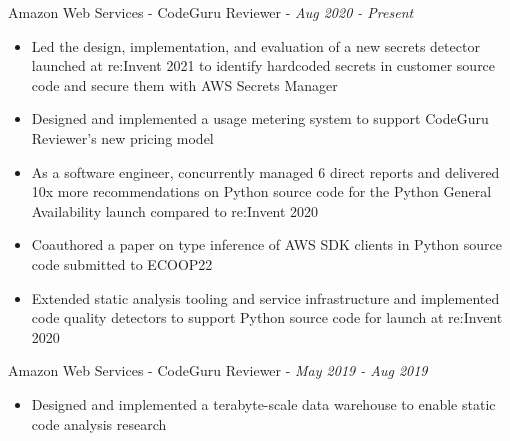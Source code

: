 \documentclass[]{template}
\begin{document}
\begin{entrylist}

\entry
{Amazon Web Services - CodeGuru Reviewer - }
{\textit{Aug 2020 - Present}}
{
\vspace{-10pt}
\begin{itemize}[leftmargin=10pt, itemsep=-9pt, topsep=2pt]
    \item Led the design, implementation, and evaluation of a new secrets detector launched at re:Invent 2021 to identify hardcoded secrets in customer source code and secure them with AWS Secrets Manager\\
    \item Designed and implemented a usage metering system to support CodeGuru Reviewer's new pricing model\\
    \item As a software engineer, concurrently managed 6 direct reports and delivered 10x more recommendations on Python source code for the Python General Availability launch compared to re:Invent 2020\\
    \item Coauthored a paper on type inference of AWS SDK clients in Python source code submitted to ECOOP22\\
    \item Extended static analysis tooling and service infrastructure and implemented code quality detectors to support Python source code for launch at re:Invent 2020
\end{itemize}
}


\entry
{Amazon Web Services - CodeGuru Reviewer - }
{\textit{May 2019 - Aug 2019}}
{
\vspace{-10pt}
\begin{itemize}[leftmargin=10pt, itemsep=-9pt, topsep=2pt]
    \item Designed and implemented a terabyte-scale data warehouse to enable static code analysis research
\end{itemize}
}



\end{entrylist}
\end{document}
